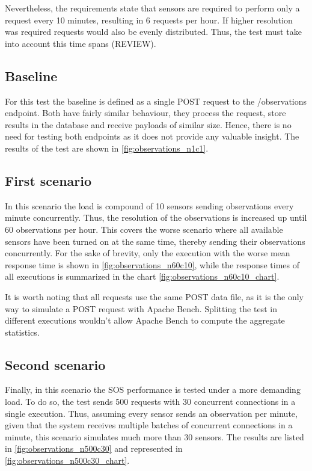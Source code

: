 Nevertheless, the requirements state that sensors are required to perform only a request every 10 minutes, resulting in 6 requests per hour. If higher resolution was required requests would also be evenly distributed. Thus, the test must take into account this time spans (REVIEW).

\subsection*{Baseline}

For this test the baseline is defined as a single POST request to the /observations endpoint. Both have fairly similar behaviour, they process the request, store results in the database and receive payloads of similar size. Hence, there is no need for testing both endpoints as it does not provide any valuable insight. 
The results of the test are shown in \ref{fig:observations_n1c1}.


\subsection*{First scenario}

In this scenario the load is compound of 10 sensors sending observations every minute concurrently. Thus, the resolution of the observations is increased up until 60 observations per hour. This covers the worse scenario where all available sensors have been turned on at the same time, thereby sending their observations concurrently. For the sake of brevity, only the execution with the worse mean response time is shown in \ref{fig:observations_n60c10}, while the response times of all executions is summarized in the chart \ref{fig:observations_n60c10_chart}.

It is worth noting that all requests use the same POST data file, as it is the only way to simulate a POST request with Apache Bench. Splitting the test in different executions wouldn't allow Apache Bench to compute the aggregate statistics.

\subsection*{Second scenario}

Finally, in this scenario the SOS performance is tested under a more demanding load. To do so, the test sends 500 requests with 30 concurrent connections in a single execution. Thus, assuming every sensor sends an observation per minute, given that the system receives multiple batches of concurrent connections in a minute, this scenario simulates much more than 30 sensors. 
The results are listed in \ref{fig:observations_n500c30} and represented in \ref{fig:observations_n500c30_chart}.


